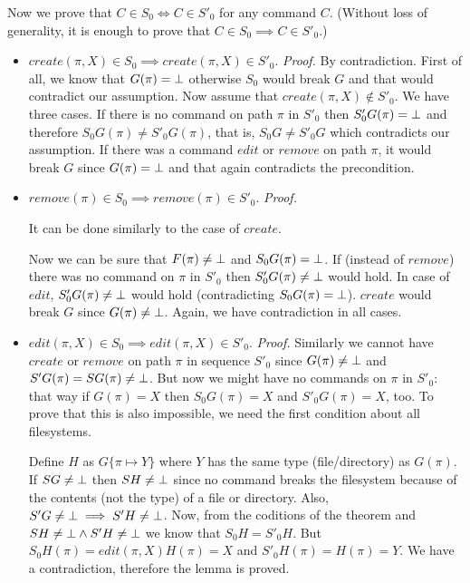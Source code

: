 Now we prove that \(C\in S_0\Longleftrightarrow C\in S'_0\) for any
command \(C\). (Without loss of generality, it is enough to prove that 
\(C\in S_0\implies C\in S'_0\).)
\begin{itemize}
\item \(create(\pi,X)\in S_0\implies create(\pi,X)\in S'_0\). 
\emph{Proof.} By contradiction. First of all, we know that
\(G(\pi)=\bot\) otherwise \(S_0\) would break \(G\) and that would
contradict our assumption. Now assume that 
\(create(\pi,X)\not\in S'_0\). 
We have three cases. If there is no command on path \(\pi\) in
\(S'_0\) then \(S'_0G(\pi)=\bot\) and therefore 
\(S_0G(\pi)\ne S'_0G(\pi)\), that is, \(S_0G\ne S'_0G\) which contradicts
our assumption. If there was a command \(edit\) or
\(remove\) on path \(\pi\), it would break \(G\) since \(G(\pi)=\bot\) and
that again contradicts the precondition.

\item \(remove(\pi)\in S_0\implies remove(\pi)\in S'_0\).
\emph{Proof.} 
\begin{forrsi}
It can be done similarly to the case of \(create\).
\end{forrsi}
\begin{notrsi}
Now we can be sure that \(F(\pi)\ne\bot\) and
\(S_0G(\pi)=\bot\). If (instead of
\(remove\)) there was no command on \(\pi\) in \(S'_0\) then 
\(S'_0G(\pi)\ne\bot\)  would hold. In case of \(edit\), 
\(S'_0G(\pi)\ne\bot\) would hold (contradicting
\(S_0G(\pi)=\bot\)). \(create\) would break \(G\) since
\(G(\pi)\ne\bot\). Again, we have contradiction in all cases.
\end{notrsi}

\item \(edit(\pi,X)\in S_0\implies edit(\pi,X)\in S'_0\).
\emph{Proof.} Similarly we cannot have \(create\) or \(remove\) on path
\(\pi\) in sequence \(S'_0\) since \(G(\pi)\ne\bot\) and 
\(S'G(\pi)=SG(\pi)\ne\bot\). 
But now we might have no commands on
\(\pi\) in \(S'_0\): that way if \(G(\pi)=X\) then \(S_0G(\pi)=X\) and
\(S'_0G(\pi)=X\), too. 
To prove that this is also
impossible, we need the first condition about all filesystems. 

Define
\(H\) as \(G\{\pi\mapsto Y\}\) where \(Y\) has the same type
(file/directory) as \(G(\pi)\). If \(SG\ne\bot\) then \(SH\ne\bot\) since no
command breaks the filesystem because of the contents (not the type) of a
file or directory. Also, \(S'G\ne\bot\implies S'H\ne\bot\). Now, 
from the coditions of the theorem
and \(SH\ne\bot\wedge S'H\ne\bot\) we know
that \(S_0H=S'_0H\). But \(S_0H(\pi)=edit(\pi,X)H(\pi)=X\) and
\(S'_0H(\pi)=H(\pi)=Y\). We have a contradiction, therefore the lemma is
proved.
\end{itemize}

